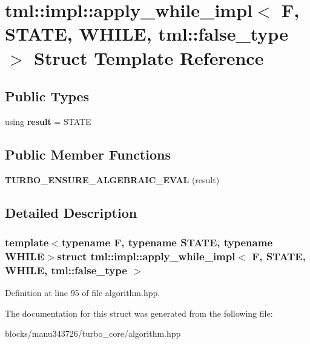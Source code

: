 \hypertarget{structtml_1_1impl_1_1apply__while__impl_3_01_f_00_01_s_t_a_t_e_00_01_w_h_i_l_e_00_01tml_1_1false__type_01_4}{\section{tml\+:\+:impl\+:\+:apply\+\_\+while\+\_\+impl$<$ F, S\+T\+A\+T\+E, W\+H\+I\+L\+E, tml\+:\+:false\+\_\+type $>$ Struct Template Reference}
\label{structtml_1_1impl_1_1apply__while__impl_3_01_f_00_01_s_t_a_t_e_00_01_w_h_i_l_e_00_01tml_1_1false__type_01_4}
}
\subsection*{Public Types}
\begin{DoxyCompactItemize}
\item 
\hypertarget{structtml_1_1impl_1_1apply__while__impl_3_01_f_00_01_s_t_a_t_e_00_01_w_h_i_l_e_00_01tml_1_1false__type_01_4_a1f6c3024ca9471d4fa4baec2579ad2b6}{using {\bfseries result} = S\+T\+A\+T\+E}\label{structtml_1_1impl_1_1apply__while__impl_3_01_f_00_01_s_t_a_t_e_00_01_w_h_i_l_e_00_01tml_1_1false__type_01_4_a1f6c3024ca9471d4fa4baec2579ad2b6}

\end{DoxyCompactItemize}
\subsection*{Public Member Functions}
\begin{DoxyCompactItemize}
\item 
\hypertarget{structtml_1_1impl_1_1apply__while__impl_3_01_f_00_01_s_t_a_t_e_00_01_w_h_i_l_e_00_01tml_1_1false__type_01_4_a1d9e77a5b1b27dd4233f818a73831b34}{{\bfseries T\+U\+R\+B\+O\+\_\+\+E\+N\+S\+U\+R\+E\+\_\+\+A\+L\+G\+E\+B\+R\+A\+I\+C\+\_\+\+E\+V\+A\+L} (result)}\label{structtml_1_1impl_1_1apply__while__impl_3_01_f_00_01_s_t_a_t_e_00_01_w_h_i_l_e_00_01tml_1_1false__type_01_4_a1d9e77a5b1b27dd4233f818a73831b34}

\end{DoxyCompactItemize}


\subsection{Detailed Description}
\subsubsection*{template$<$typename F, typename S\+T\+A\+T\+E, typename W\+H\+I\+L\+E$>$struct tml\+::impl\+::apply\+\_\+while\+\_\+impl$<$ F, S\+T\+A\+T\+E, W\+H\+I\+L\+E, tml\+::false\+\_\+type $>$}



Definition at line 95 of file algorithm.\+hpp.



The documentation for this struct was generated from the following file\+:\begin{DoxyCompactItemize}
\item 
blocks/manu343726/turbo\+\_\+core/algorithm.\+hpp\end{DoxyCompactItemize}
